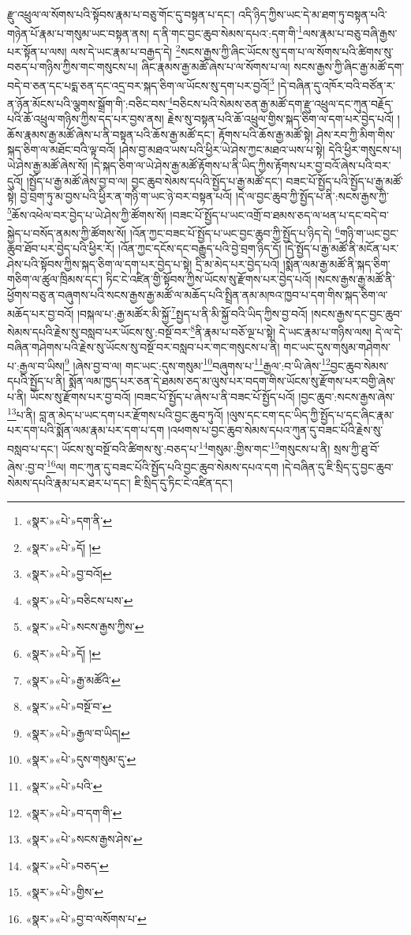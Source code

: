 རྫུ་འཕྲུལ་ལ་སོགས་པའི་སྟོབས་རྣམ་པ་བཅུ་གོང་དུ་བསྟན་པ་དང་། འདི་ཉིད་ཀྱིས་ཡང་དེ་མ་ཐག་ཏུ་བསྟན་པའི་གཉེན་པོ་རྣམ་པ་གསུམ་ཡང་བསྟན་ནས། ད་ནི་གང་བྱང་ཆུབ་སེམས་དཔའ་:དག་གི་\footnote{«སྣར་»«པེ་»དག་ནི་}ལས་རྣམ་པ་བཅུ་བཞི་རྒྱས་པར་སྟོན་པ་ལས། ལས་དེ་ཡང་རྣམ་པ་བརྒྱད་དེ། \footnote{«སྣར་»«པེ་»དོ། ། }སངས་རྒྱས་ཀྱི་ཞིང་ཡོངས་སུ་དག་པ་ལ་སོགས་པའི་ཚིགས་སུ་བཅད་པ་གཉིས་ཀྱིས་གང་གསུངས་པ། ཞིང་རྣམས་རྒྱ་མཚོ་ཞེས་པ་ལ་སོགས་པ་ལ། སངས་རྒྱས་ཀྱི་ཞིང་རྒྱ་མཚོ་དག་བདེ་བ་ཅན་དང་པདྨ་ཅན་དང་འདྲ་བར་སྐད་ཅིག་ལ་ཡོངས་སུ་དག་པར་བྱའོ།\footnote{«སྣར་»«པེ་»བྱ་བའོ།} །དེ་བཞིན་དུ་འཁོར་བའི་བཙོན་ར་ན་ཉོན་མོངས་པའི་ལྕགས་སྒྲོག་གི་:བཅིང་བས་\footnote{«སྣར་»«པེ་»བཅིངས་པས་}བཅིངས་པའི་སེམས་ཅན་རྒྱ་མཚོ་དག་རྫུ་འཕྲུལ་དང་ཀུན་བརྗོད་པའི་ཆོ་འཕྲུལ་གཉིས་ཀྱིས་དད་པར་བྱས་ནས། རྗེས་སུ་བསྟན་པའི་ཆོ་འཕྲུལ་གྱིས་སྐད་ཅིག་ལ་དག་པར་བྱེད་པའོ། །ཆོས་རྣམས་རྒྱ་མཚོ་ཞེས་པ་ནི་བསྟན་པའི་ཆོས་རྒྱ་མཚོ་དང་། རྟོགས་པའི་ཆོས་རྒྱ་མཚོ་སྟེ། ཤེས་རབ་ཀྱི་མིག་གིས་སྐད་ཅིག་ལ་མཐོང་བའི་ལྟ་བའོ། །ཤེས་བྱ་མཐའ་ཡས་པའི་ཕྱིར་ཡེ་ཤེས་ཀྱང་མཐའ་ཡས་པ་སྟེ། དེའི་ཕྱིར་གསུངས་པ། ཡེ་ཤེས་རྒྱ་མཚོ་ཞེས་སོ། །དེ་སྐད་ཅིག་ལ་ཡེ་ཤེས་རྒྱ་མཚོ་རྟོགས་པ་ནི་ཡིད་ཀྱིས་རྟོགས་པར་བྱ་བའོ་ཞེས་པའི་བར་དུའོ། །སྤྱོད་པ་རྒྱ་མཚོ་ཞེས་བྱ་བ་ལ། བྱང་ཆུབ་སེམས་དཔའི་སྤྱོད་པ་རྒྱ་མཚོ་དང་། བཟང་པོ་སྤྱོད་པའི་སྤྱོད་པ་རྒྱ་མཚོ་སྟེ། བྱེ་བྲག་ཏུ་མ་བྱས་པའི་ཕྱིར་ན་གཉི་ག་ཡང་ཉེ་བར་བསྟན་པའོ། །དེ་ལ་བྱང་ཆུབ་ཀྱི་སྤྱོད་པ་ནི་:སངས་རྒྱས་ཀྱི་\footnote{«སྣར་»«པེ་»སངས་རྒྱས་ཀྱིས་}ཆོས་འཕེལ་བར་བྱེད་པ་ཡེ་ཤེས་ཀྱི་ཚོགས་སོ། །བཟང་པོ་སྤྱོད་པ་ཡང་འགྲོ་བ་ཐམས་ཅད་ལ་ཕན་པ་དང་བདེ་བ་སྐྱེད་པ་བསོད་ནམས་ཀྱི་ཚོགས་སོ། །འོན་ཀྱང་བཟང་པོ་སྤྱོད་པ་ཡང་བྱང་ཆུབ་ཀྱི་སྤྱོད་པ་ཉིད་དེ། \footnote{«སྣར་»«པེ་»དོ། ། }གཉི་ག་ཡང་བྱང་ཆུབ་ཐོབ་པར་བྱེད་པའི་ཕྱིར་རོ། །འོན་ཀྱང་དངོས་དང་བརྒྱུད་པའི་བྱེ་བྲག་ཉིད་དོ། །དེ་སྤྱོད་པ་རྒྱ་མཚོ་ནི་མངོན་པར་ཤེས་པའི་སྟོབས་ཀྱིས་སྐད་ཅིག་ལ་དག་པར་བྱེད་པ་སྟེ། དྲི་མ་མེད་པར་བྱེད་པའོ། །སྨོན་ལམ་རྒྱ་མཚོ་ནི་སྐད་ཅིག་གཅིག་ལ་ཚུལ་ཁྲིམས་དང་། ཏིང་ངེ་འཛིན་གྱི་སྟོབས་ཀྱིས་ཡོངས་སུ་རྫོགས་པར་བྱེད་པའོ། །སངས་རྒྱས་རྒྱ་མཚོ་ནི་ཕྱོགས་བཅུ་ན་བཞུགས་པའི་སངས་རྒྱས་རྒྱ་མཚོ་ལ་མཆོད་པའི་སྤྲིན་ནམ་མཁའ་ཁྱབ་པ་དག་གིས་སྐད་ཅིག་ལ་མཆོད་པར་བྱ་བའོ། །བསྐལ་པ་:རྒྱ་མཚོར་མི་སྐྱོ་\footnote{«སྣར་»«པེ་»རྒྱ་མཚོའི་}སྤྱད་པ་ནི་མི་སྐྱོ་བའི་ཡིད་ཀྱིས་བྱ་བའོ། །སངས་རྒྱས་དང་བྱང་ཆུབ་སེམས་དཔའི་རྗེས་སུ་བསླབ་པར་ཡོངས་སུ་:བསྔོ་བར་\footnote{«སྣར་»«པེ་»བསྔོ་བ་}ནི་རྣམ་པ་བཅོ་ལྔ་པ་སྟེ། དེ་ཡང་རྣམ་པ་གཉིས་ལས། དེ་ལ་དེ་བཞིན་གཤེགས་པའི་རྗེས་སུ་ཡོངས་སུ་བསྔོ་བར་བསླབ་པར་གང་གསུངས་པ་ནི། གང་ཡང་དུས་གསུམ་གཤེགས་པ་:རྒྱལ་བ་ཡིས།\footnote{«སྣར་»«པེ་»རྒྱལ་བ་ཡིད།} །ཞེས་བྱ་བ་ལ། གང་ཡང་:དུས་གསུམ་\footnote{«སྣར་»«པེ་»དུས་གསུམ་དུ་}བཞུགས་པ་\footnote{«སྣར་»«པེ་»པའི་}རྒྱལ་:བ་ཡི་ཞེས་\footnote{«སྣར་»«པེ་»བ་དག་གི་}བྱང་ཆུབ་སེམས་དཔའི་སྤྱོད་པ་ནི། སྨོན་ལམ་ཁྱད་པར་ཅན་དེ་ཐམས་ཅད་མ་ལུས་པར་བདག་གིས་ཡོངས་སུ་རྫོགས་པར་བགྱི་ཞེས་པ་ནི། ཡོངས་སུ་རྫོགས་པར་བྱ་བའོ། །བཟང་པོ་སྤྱོད་པ་ཞེས་པ་ནི་བཟང་པོ་སྤྱོད་པའོ། །བྱང་ཆུབ་:སངས་རྒྱས་ཞེས་\footnote{«སྣར་»«པེ་»སངས་རྒྱས་ཤེས་}པ་ནི། བླ་ན་མེད་པ་ཡང་དག་པར་རྫོགས་པའི་བྱང་ཆུབ་ཏུའོ། །ལུས་དང་ངག་དང་ཡིད་ཀྱི་སྤྱོད་པ་དང་ཞིང་རྣམ་པར་དག་པའི་སྨོན་ལམ་རྣམ་པར་དག་པ་དག །འཕགས་པ་བྱང་ཆུབ་སེམས་དཔའ་ཀུན་དུ་བཟང་པོའི་རྗེས་སུ་བསླབ་པ་དང་། ཡོངས་སུ་བསྔོ་བའི་ཚིགས་སུ་:བཅད་པ་\footnote{«སྣར་»«པེ་»བཅད་}གསུམ་:གྱིས་གང་\footnote{«སྣར་»«པེ་»གྱིས་}གསུངས་པ་ནི། སྲས་ཀྱི་ཐུ་བོ་ཞེས་:བྱ་བ་\footnote{«སྣར་»«པེ་»བྱ་བ་ལསོགས་པ་}ལ། གང་ཀུན་དུ་བཟང་པོའི་སྤྱོད་པའི་བྱང་ཆུབ་སེམས་དཔའ་དག །དེ་བཞིན་དུ་ཇི་སྲིད་དུ་བྱང་ཆུབ་སེམས་དཔའི་རྣམ་པར་ཐར་པ་དང་། ཇི་སྲིད་དུ་ཏིང་ངེ་འཛིན་དང་། 